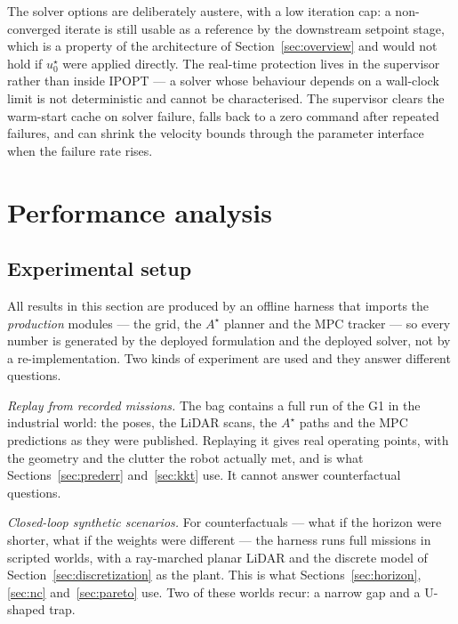 \documentclass[11pt,a4paper]{article}
\newcommand{\astar}{$A^\star$}
\begin{document}
The solver options are deliberately austere, with a low iteration cap: a non-converged iterate is still
usable as a reference by the downstream setpoint stage, which is a property of the architecture of
Section~\ref{sec:overview} and would not hold if $u^\star_0$ were applied directly. The real-time protection
lives in the supervisor rather than inside IPOPT --- a solver whose behaviour depends on a wall-clock limit
is not deterministic and cannot be characterised. The supervisor clears the warm-start cache on solver
failure, falls back to a zero command after repeated failures, and can shrink the velocity bounds through the
parameter interface when the failure rate rises.

\section{Performance analysis}
\label{sec:performance}

\subsection{Experimental setup}
\label{sec:setup}

All results in this section are produced by an offline harness that imports the \emph{production} modules ---
the grid, the \astar{} planner and the MPC tracker --- so every number is generated by the deployed
formulation and the deployed solver, not by a re-implementation. Two kinds of experiment are used and they
answer different questions.

\emph{Replay from recorded missions.} The bag \resBag{} contains a full run of the G1 in the industrial world:
the poses, the LiDAR scans, the \astar{} paths and the MPC predictions as they were published. Replaying it
gives real operating points, with the geometry and the clutter the robot actually met, and is what
Sections~\ref{sec:prederr} and~\ref{sec:kkt} use. It cannot answer counterfactual questions.

\emph{Closed-loop synthetic scenarios.} For counterfactuals --- what if the horizon were shorter, what if the
weights were different --- the harness runs full missions in scripted worlds, with a ray-marched planar
LiDAR and the discrete model of Section~\ref{sec:discretization} as the plant. This is what
Sections~\ref{sec:horizon}, \ref{sec:nc} and~\ref{sec:pareto} use. Two of these worlds recur: a narrow gap
and a U-shaped trap.
\end{document}
